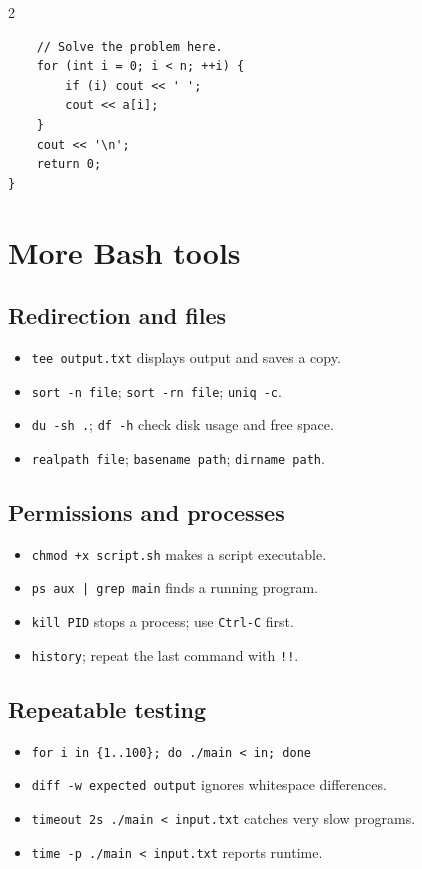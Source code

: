 \documentclass[10pt]{article}
\newcommand{\cmd}[1]{\texttt{\small #1}}
\begin{document}
\begin{multicols}{2}
\begin{framed}
\begin{verbatim}
    // Solve the problem here.
    for (int i = 0; i < n; ++i) {
        if (i) cout << ' ';
        cout << a[i];
    }
    cout << '\n';
    return 0;
}
\end{verbatim}
\end{framed}

\section{More Bash tools}
\subsection{Redirection and files}
\begin{itemize}
  \item \cmd{tee output.txt} displays output and saves a copy.
  \item \cmd{sort -n file}; \cmd{sort -rn file}; \cmd{uniq -c}.
  \item \cmd{du -sh .}; \cmd{df -h} check disk usage and free space.
  \item \cmd{realpath file}; \cmd{basename path}; \cmd{dirname path}.
\end{itemize}

\subsection{Permissions and processes}
\begin{itemize}
  \item \cmd{chmod +x script.sh} makes a script executable.
  \item \cmd{ps aux | grep main} finds a running program.
  \item \cmd{kill PID} stops a process; use \cmd{Ctrl-C} first.
  \item \cmd{history}; repeat the last command with \cmd{!!}.
\end{itemize}

\subsection{Repeatable testing}
\begin{itemize}
  \item \cmd{for i in \{1..100\}; do ./main < in; done}
  \item \cmd{diff -w expected output} ignores whitespace differences.
  \item \cmd{timeout 2s ./main < input.txt} catches very slow programs.
  \item \cmd{time -p ./main < input.txt} reports runtime.
\end{itemize}

\end{multicols}
\end{document}
